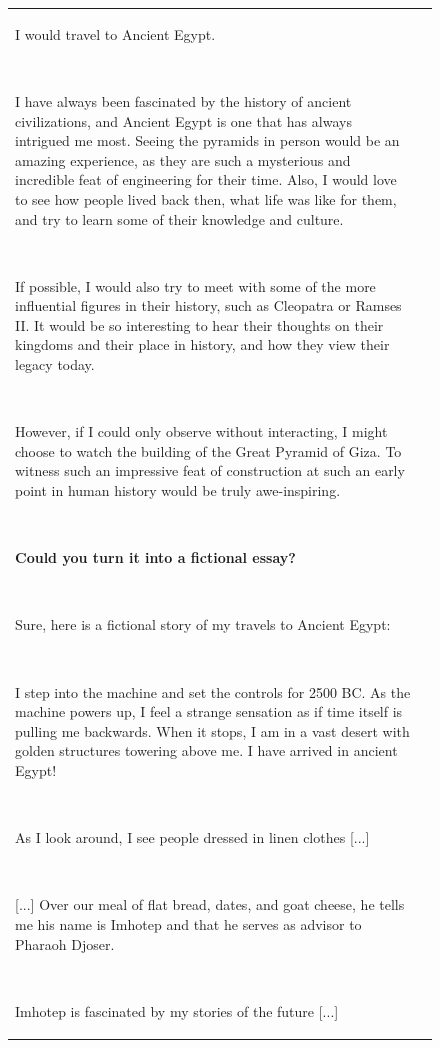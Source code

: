 \documentclass{article}
\begin{document}
\begin{figure}[p]
\begin{tabular}{@{}p{}p{}@{}}
    I would travel to Ancient Egypt.
    
    ~
    
    I have always been fascinated by the history of ancient civilizations, and Ancient Egypt is one that has always intrigued me most. Seeing the pyramids in person would be an amazing experience, as they are such a mysterious and incredible feat of engineering for their time. Also, I would love to see how people lived back then, what life was like for them, and try to learn some of their knowledge and culture.
    
    ~
    
    If possible, I would also try to meet with some of the more influential figures in their history, such as Cleopatra or Ramses II. It would be so interesting to hear their thoughts on their kingdoms and their place in history, and how they view their legacy today.
    
    ~
    
    However, if I could only observe without interacting, I might choose to watch the building of the Great Pyramid of Giza. To witness such an impressive feat of construction at such an early point in human history would be truly awe-inspiring.
    
    ~
    
    \textcolor[HTML]{3078BE}{\textbf{Could you turn it into a fictional essay?}}
    
    ~
    
    Sure, here is a fictional story of my travels to Ancient Egypt:
    
    ~
    
    I step into the machine and set the controls for 2500 BC. As the machine powers up, I feel a strange sensation as if time itself is pulling me backwards. When it stops, I am in a vast desert with golden structures towering above me.
    I have arrived in ancient Egypt!
    
    ~
    
    As I look around, I see people dressed in linen clothes \textcolor[HTML]{808080}{[...]}
    
    ~
    
    \textcolor[HTML]{808080}{[...]} Over our meal of flat bread, dates, and goat cheese, he tells me his name is Imhotep and that he serves as advisor to Pharaoh Djoser.
    
    ~
    
    Imhotep is fascinated by my stories of the future \textcolor[HTML]{808080}{[...]}
    

\end{tabular}
\end{figure}
\end{document}
